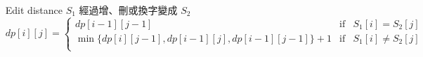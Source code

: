 \begin{itemize}

\item[Edit distance]
    \subitem $S_1$ 經過增、刪或換字變成 $S_2$
    \subitem $dp[i][j] = \left \{
        \begin{array}{lrc}
            dp[i-1][j-1] & \mbox{if} & S_1[i] = S_2[j] \\
            \min\{ dp[i][j-1], dp[i-1][j], dp[i-1][j-1]\}+1 & \mbox{if} & S_1[i] \neq S_2[j] \\
        \end{array}\right .$
    
\end{itemize}